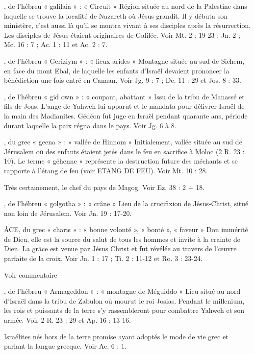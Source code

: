 \begin{multicols}{2}
, de l’hébreu « galilaia » : « Circuit »
Région située au nord de la Palestine dans laquelle se trouve la localité de Nazareth où Jésus grandit. Il y débuta son ministère, c’est aussi là qu’il se montra vivant à ses disciples après la résurrection. Les disciples de Jésus étaient originaires de Galilée. Voir Mt. 2 : 19-23 ; Jn. 2 ; Mc. 16 : 7 ; Ac. 1 : 11 et Ac. 2 : 7.


, de l'hébreu « Geriziym » : « lieux arides »
Montagne située au sud de Sichem, en face du mont Ebal, de laquelle les enfants d’Israël devaient prononcer la bénédiction une fois entré en Canaan. Voir Jg. 9 : 7 ; De. 11 : 29 et Jos. 8 : 33.


, de l'hébreu « gid own » : « coupant, abattant »
Issu de la tribu de Manassé et fils de Joas. L'ange de Yahweh lui apparut et le mandata pour délivrer Israël de la main des Madianites. Gédéon fut juge en Israël pendant quarante ans, période durant laquelle la paix régna dans le pays. Voir Jg. 6 à 8.


, du grec « geena » : « vallée de Hinnom »
Initialement, vallée située au sud de Jérusalem où des enfants étaient jetés dans le feu en sacrifice à Moloc (2 R. 23 : 10). Le terme « géhenne » représente la destruction future des méchants et se rapporte à l'étang de feu (voir ETANG DE FEU). Voir Mt. 10 : 28.


Très certainement, le chef du pays de Magog. Voir Ez. 38 : 2 + 18.


, de l’hébreu « golgotha » : « crâne »
Lieu de la crucifixion de Jésus-Christ, situé non loin de Jérusalem. Voir Jn. 19 : 17-20.


ÂCE, du grec « charis » : « bonne volonté », « bonté », « faveur »
Don immérité de Dieu, elle est la source du salut de tous les hommes et invite à la crainte de Dieu. La grâce est venue par Jésus Christ et fut révélée au travers de l’œuvre parfaite de la croix. Voir Jn. 1 : 17 ; Ti. 2 : 11-12 et Ro. 3 : 23-24.


Voir commentaire


, de l’hébreu « Armageddon » : « montagne de Méguiddo »
Lieu situé au nord d'Israël dans la tribu de Zabulon où mourut le roi Josias. Pendant le millenium, les rois et puissants de la terre s’y rassembleront pour combattre Yahweh et son armée. Voir 2 R. 23 : 29 et Ap. 16 : 13-16.

Israélites nés hors de la terre promise ayant adoptés le mode de vie grec et parlant la langue grecque. Voir Ac. 6 : 1.



\end{multicols}

